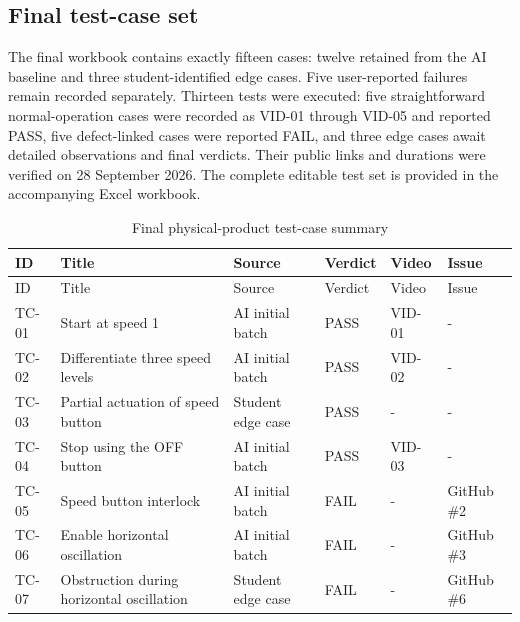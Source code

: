 \subsection{Final test-case set}

The final workbook contains exactly fifteen cases: twelve retained from the AI baseline and three student-identified edge cases. Five user-reported failures remain recorded separately. Thirteen tests were executed: five straightforward normal-operation cases were recorded as VID-01 through VID-05 and reported PASS, five defect-linked cases were reported FAIL, and three edge cases await detailed observations and final verdicts. Their public links and durations were verified on 28 September 2026. The complete editable test set is provided in the accompanying Excel workbook.

\begin{longtable}{p{}p{}p{}p{}p{}p{}}

\caption{Final physical-product test-case summary}\\\toprule

ID & Title & Source & Verdict & Video & Issue \\\midrule\endfirsthead

\toprule ID & Title & Source & Verdict & Video & Issue \\\midrule\endhead

TC-01 & Start at speed 1 & AI initial batch & PASS & VID-01 & - \\

TC-02 & Differentiate three speed levels & AI initial batch & PASS & VID-02 & - \\

TC-03 & Partial actuation of speed button & Student edge case & PASS & - & - \\

TC-04 & Stop using the OFF button & AI initial batch & PASS & VID-03 & - \\

TC-05 & Speed button interlock & AI initial batch & FAIL & - & GitHub \#2 \\

TC-06 & Enable horizontal oscillation & AI initial batch & FAIL & - & GitHub \#3 \\

TC-07 & Obstruction during horizontal oscillation & Student edge case & FAIL & - & GitHub \#6 \\


\end{longtable}
